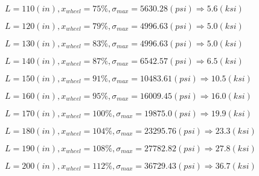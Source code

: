 \documentclass[11pt]{article}
\newcommand{\prompt}[4]{
        {\ttfamily\llap{{\color{#2}[#3]:\hspace{3pt}#4}}\vspace{-\baselineskip}}
    }
\begin{document}
            
\prompt{Out}{outcolor}{12}{}
    
    $L= 110(in), x_{wheel}=75 \%, \sigma_{max}=5630.28(psi) \Rightarrow 5.6(ksi)$

    
 
            
\prompt{Out}{outcolor}{12}{}
    
    $L= 120(in), x_{wheel}=79 \%, \sigma_{max}=4996.63(psi) \Rightarrow 5.0(ksi)$

    
 
            
\prompt{Out}{outcolor}{12}{}
    
    $L= 130(in), x_{wheel}=83 \%, \sigma_{max}=4996.63(psi) \Rightarrow 5.0(ksi)$

    
 
            
\prompt{Out}{outcolor}{12}{}
    
    $L= 140(in), x_{wheel}=87 \%, \sigma_{max}=6542.57(psi) \Rightarrow 6.5(ksi)$

    
 
            
\prompt{Out}{outcolor}{12}{}
    
    $L= 150(in), x_{wheel}=91 \%, \sigma_{max}=10483.61(psi) \Rightarrow 10.5(ksi)$

    
 
            
\prompt{Out}{outcolor}{12}{}
    
    $L= 160(in), x_{wheel}=95 \%, \sigma_{max}=16009.45(psi) \Rightarrow 16.0(ksi)$

    
 
            
\prompt{Out}{outcolor}{12}{}
    
    $L= 170(in), x_{wheel}=100 \%, \sigma_{max}=19875.0(psi) \Rightarrow 19.9(ksi)$

    
 
            
\prompt{Out}{outcolor}{12}{}
    
    $L= 180(in), x_{wheel}=104 \%, \sigma_{max}=23295.76(psi) \Rightarrow 23.3(ksi)$

    
 
            
\prompt{Out}{outcolor}{12}{}
    
    $L= 190(in), x_{wheel}=108 \%, \sigma_{max}=27782.82(psi) \Rightarrow 27.8(ksi)$

    
 
            
\prompt{Out}{outcolor}{12}{}
    
    $L= 200(in), x_{wheel}=112 \%, \sigma_{max}=36729.43(psi) \Rightarrow 36.7(ksi)$

    
 
            
\prompt{Out}{outcolor}{12}{}
    
\end{document}
